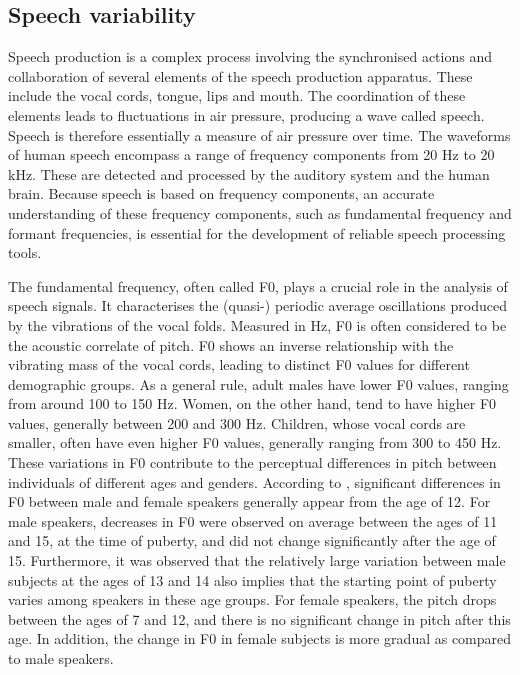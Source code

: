 \subsection{Speech variability}%
Speech production is a complex process involving the synchronised actions and collaboration of several elements of the speech production apparatus. These include the vocal cords, tongue, lips and mouth. The coordination of these elements leads to fluctuations in air pressure, producing a wave called speech. Speech is therefore essentially a measure of air pressure over time. The waveforms of human speech encompass a range of frequency components from 20 \ac{Hz} to 20 kHz. These are detected and processed by the auditory system and the human brain. Because speech is based on frequency components, an accurate understanding of these frequency components, such as fundamental frequency and formant frequencies, is essential for the development of reliable speech processing tools.

The fundamental frequency, often called F0, plays a crucial role in the analysis of speech signals. It characterises the (quasi-) periodic average oscillations produced by the vibrations of the vocal folds. Measured in \ac{Hz}, F0 is often considered to be the acoustic correlate of pitch. F0 shows an inverse relationship with the vibrating mass of the vocal cords, leading to distinct F0 values for different demographic groups. As a general rule, adult males have lower F0 values, ranging from around 100 to 150 \ac{Hz}. Women, on the other hand, tend to have higher F0 values, generally between 200 and 300 \ac{Hz}. Children, whose vocal cords are smaller, often have even higher F0 values, generally ranging from 300 to 450 \ac{Hz}. These variations in F0 contribute to the perceptual differences in pitch between individuals of different ages and genders. 
According to \cite{Acoustic_change_children}, significant differences in F0 between male and female speakers generally appear from the age of 12. For male speakers, decreases in F0 were observed on average between the ages of 11 and 15, at the time of puberty, and did not change significantly after the age of 15. Furthermore, it was observed that the relatively large variation between male subjects at the ages of 13 and 14 also implies that the starting point of puberty varies among speakers in these age groups. For female speakers, the pitch drops between the ages of 7 and 12, and there is no significant change in pitch after this age. In addition, the change in F0 in female subjects is more gradual as compared to male speakers.

